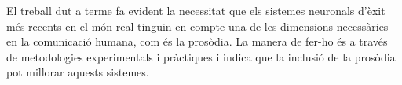 El treball dut a terme fa evident la necessitat que els sistemes neuronals d’èxit més recents en el món real tinguin en compte una de les dimensions necessàries en la comunicació humana, com és la prosòdia. La manera de fer-ho és a través de metodologies experimentals i pràctiques i indica que la inclusió de la prosòdia pot millorar aquests sistemes.

\vspace*{\fill}








